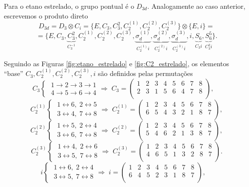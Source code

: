 \documentclass[a4paper,10pt]{article}
\newcommand{\lr}{\leftrightarrow}
\begin{document}
Para o etano estrelado, o grupo pontual é o $D_{3d}$. Analogamente ao caso anterior, escrevemos o produto direto
\begin{equation} \label{eq:D3d-direct}
D_{3d} = D_3 \otimes C_{i} =
\{E, C_3, C_3^2, C_2^{(1)}, C_2^{(2)}, C_2^{(3)}\} \otimes \{E, i\} =
\end{equation}
$$
=
\{E, C_3, \underbrace{C_3^2}_{C_3^{-1}}, C_2^{(1)}, C_2^{(2)}, C_2^{(3)},
\underbrace{\sigma_d^{(1)}}_{C_2^{(1)} i},
\underbrace{\sigma_d^{(2)}}_{C_2^{(2)} i},
\underbrace{\sigma_d^{(3)}}_{C_2^{(3)} i},
i,
\underbrace{S_6}_{C_3 i},
\underbrace{S_6^5}_{C_3^2 i}\}.
$$

Seguindo as Figuras \ref{fig:etano_estrelado} e \ref{fig:C2_estrelado}, os elementos ``base'' $C_3, C_2^{(1)}, C_2^{(2)}, C_2^{(3)}, i$ são definidos pelas permutações
$$
C_3
\begin{cases}
\; 1 \to 2 \to 3 \to 1 \\
\; 4 \to 5 \to 6 \to 4
\end{cases}
\Rightarrow \;
C_3 =
\begin{pmatrix}
1 & 2 & 3 & 4 & 5 & 6 & 7 & 8 \\
2 & 3 & 1 & 5 & 6 & 4 & 7 & 8 \\
\end{pmatrix}, \quad
$$
$$
C_2^{(1)}
\begin{cases}
\; 1 \lr 6, \; 2 \lr 5 \\
\; 3 \lr 4, \; 7 \lr 8
\end{cases}
\Rightarrow \;
C_2^{(1)} =
\begin{pmatrix}
1 & 2 & 3 & 4 & 5 & 6 & 7 & 8 \\
6 & 5 & 4 & 3 & 2 & 1 & 8 & 7 \\
\end{pmatrix},
$$
$$
C_2^{(2)}
\begin{cases}
\; 1 \lr 5, \; 2 \lr 4 \\
\; 3 \lr 6, \; 7 \lr 8
\end{cases}
\Rightarrow \;
C_2^{(2)} =
\begin{pmatrix}
1 & 2 & 3 & 4 & 5 & 6 & 7 & 8 \\
5 & 4 & 6 & 2 & 1 & 3 & 8 & 7 \\
\end{pmatrix},
$$
$$
C_2^{(3)}
\begin{cases}
\; 1 \lr 4, \; 2 \lr 6 \\
\; 3 \lr 5, \; 7 \lr 8
\end{cases}
\Rightarrow \;
C_2^{(3)} =
\begin{pmatrix}
1 & 2 & 3 & 4 & 5 & 6 & 7 & 8 \\
4 & 6 & 5 & 1 & 3 & 2 & 8 & 7 \\
\end{pmatrix}.
$$
$$
i
\begin{cases}
\; 1 \lr 6, \; 2 \lr 4 \\
\; 3 \lr 5, \; 7 \lr 8
\end{cases}
\Rightarrow \;
i =
\begin{pmatrix}
1 & 2 & 3 & 4 & 5 & 6 & 7 & 8 \\
6 & 4 & 5 & 2 & 3 & 1 & 8 & 7 \\
\end{pmatrix}, \quad
$$
\end{document}
